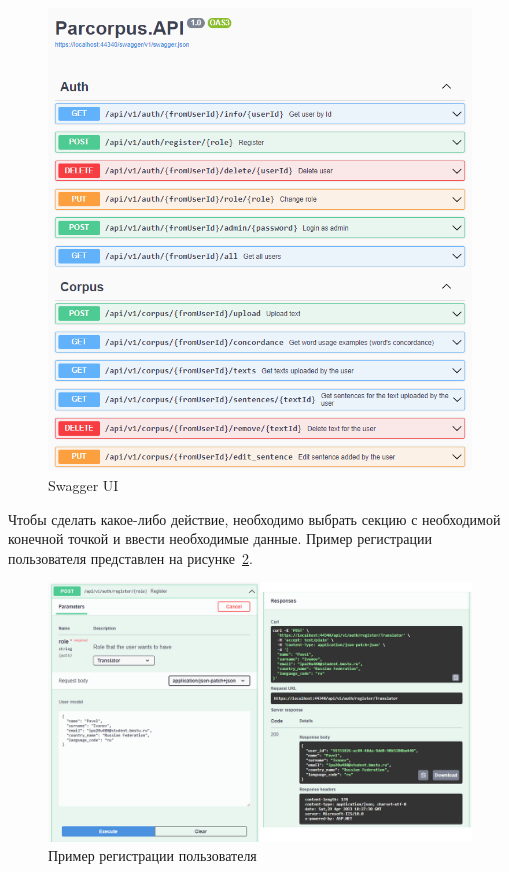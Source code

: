 \captionsetup{singlelinecheck = false, justification=centering}
\begin{figure}[H]
	\centering
	\includegraphics[scale=1]{img/swagger}
	\caption{Swagger UI}
	\label{swagger}
\end{figure}

\clearpage

Чтобы сделать какое-либо действие, необходимо выбрать секцию с необходимой конечной точкой и ввести необходимые данные. 
Пример регистрации пользователя представлен на рисунке~\ref{register}.

\captionsetup{singlelinecheck = false, justification=centering}
\begin{figure}[ht]
	\centering
	\includegraphics[width=\textwidth]{img/register}
	\caption{Пример регистрации пользователя}
	\label{register}
\end{figure}

